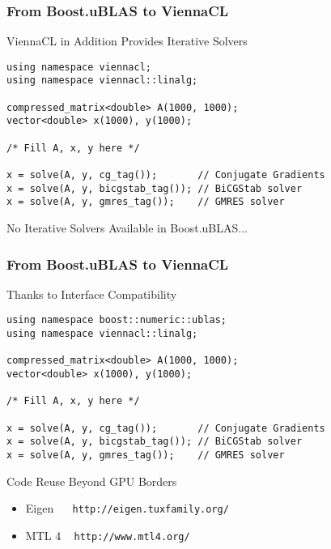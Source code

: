 \begin{frame}[fragile]
\frametitle{From Boost.uBLAS to ViennaCL}
\begin{block}{ViennaCL in Addition Provides Iterative Solvers}
  \begin{lstlisting}
using namespace viennacl;
using namespace viennacl::linalg;

compressed_matrix<double> A(1000, 1000);
vector<double> x(1000), y(1000);

/* Fill A, x, y here */

x = solve(A, y, cg_tag());       // Conjugate Gradients
x = solve(A, y, bicgstab_tag()); // BiCGStab solver
x = solve(A, y, gmres_tag());    // GMRES solver
  \end{lstlisting}
\end{block}

 \begin{block}{No Iterative Solvers Available in Boost.uBLAS...}
  \vspace*{1.22cm}
 \end{block}
\end{frame}


\begin{frame}[fragile]
\frametitle{From Boost.uBLAS to ViennaCL}
\begin{block}{Thanks to Interface Compatibility}
  \begin{lstlisting}
using namespace boost::numeric::ublas;
using namespace viennacl::linalg;

compressed_matrix<double> A(1000, 1000);
vector<double> x(1000), y(1000);

/* Fill A, x, y here */

x = solve(A, y, cg_tag());       // Conjugate Gradients
x = solve(A, y, bicgstab_tag()); // BiCGStab solver
x = solve(A, y, gmres_tag());    // GMRES solver
  \end{lstlisting} 
\end{block}

\begin{block}{Code Reuse Beyond GPU Borders}
 \begin{itemize}
  \item Eigen \ { \ \footnotesize \verb|http://eigen.tuxfamily.org/|}
  \item MTL 4 \ { \footnotesize \verb|http://www.mtl4.org/|}
 \end{itemize}
\end{block}

\end{frame}


